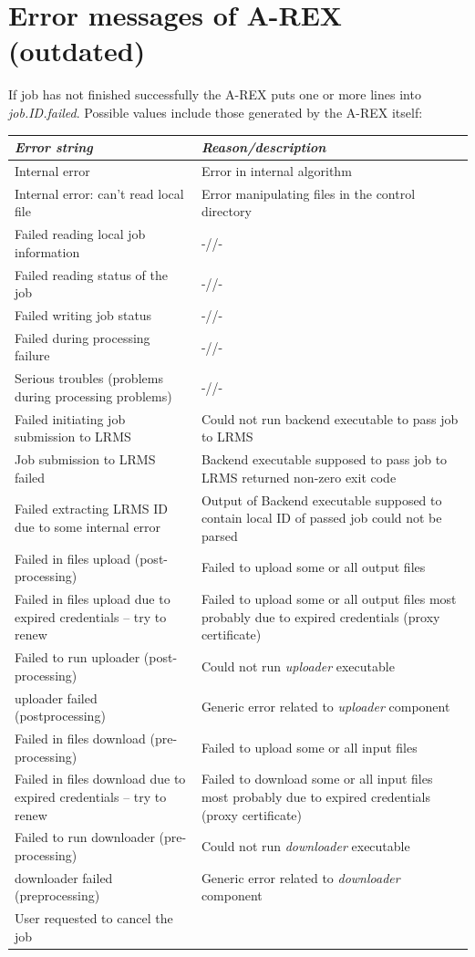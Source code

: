 \documentclass{article}                            %
\begin{document}
\section{Error messages of A-REX (outdated)\label{annex:arex-errors}}

If job has not finished successfully the A-REX puts one or more lines
into \textit{job.ID.failed}. Possible values include those generated
by the A-REX itself:\\
\begin{longtable}{|p{5cm}|p{10cm}|}
\hline 
\emph{Error string}&
\emph{Reason/description}\tabularnewline
\hline 
Internal error&
Error in internal algorithm\tabularnewline
\hline 
Internal error: can't read local file&
Error manipulating files in the control directory\tabularnewline
\hline 
Failed reading local job information&
-//-\tabularnewline
\hline 
Failed reading status of the job&
-//-\tabularnewline
\hline 
Failed writing job status&
-//-\tabularnewline
\hline 
Failed during processing failure&
-//-\tabularnewline
\hline 
Serious troubles (problems during processing problems)&
-//-\tabularnewline
\hline 
Failed initiating job submission to LRMS&
Could not run backend executable to pass job to LRMS\tabularnewline
\hline 
Job submission to LRMS failed&
Backend executable supposed to pass job to LRMS returned non-zero
exit code\tabularnewline
\hline 
Failed extracting LRMS ID due to some internal error&
Output of Backend executable supposed to contain local ID of passed
job could not be parsed\tabularnewline
\hline 
Failed in files upload (post-processing)&
Failed to upload some or all output files\tabularnewline
\hline 
Failed in files upload due to expired credentials -- try to renew&
Failed to upload some or all output files most probably due to expired
credentials (proxy certificate)\tabularnewline
\hline 
Failed to run uploader (post-processing)&
Could not run \emph{uploader} executable\tabularnewline
\hline 
uploader failed (postprocessing)&
Generic error related to \emph{uploader} component\tabularnewline
\hline 
Failed in files download (pre-processing)&
Failed to upload some or all input files\tabularnewline
\hline 
Failed in files download due to expired credentials -- try to renew&
Failed to download some or all input files most probably due to expired
credentials (proxy certificate)\tabularnewline
\hline 
Failed to run downloader (pre-processing)&
Could not run \emph{downloader} executable\tabularnewline
\hline
downloader failed (preprocessing)&
Generic error related to \emph{downloader} component\tabularnewline
\hline
User requested to cancel the job&

\end{longtable}
\end{document}
